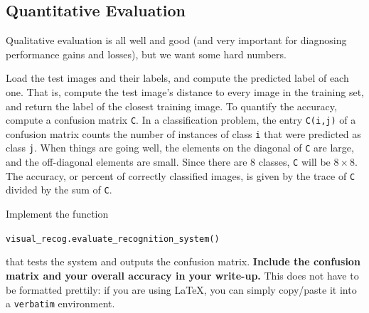 \documentclass[10pt]{article}
\makeatletter
\DeclareRobustCommand\onedot{\futurelet\@let@token\@onedot}
\def\@onedot{\ifx\@let@token.\else.\null\fi\xspace}
\def\eg{\emph{e.g}\onedot} \def\Eg{\emph{E.g}\onedot}
\makeatother
\begin{document}



\subsection{Quantitative Evaluation}

Qualitative evaluation is all well and good (and very important
for diagnosing performance gains and losses), but we want some hard numbers.

Load the test images and their labels, and compute the predicted
label of each one. That is, compute the test image's distance to every image in the training set, and return the label of the closest training image. To quantify the accuracy, compute a confusion matrix {\tt C}. In a classification problem, the entry {\tt C(i,j)} of a confusion matrix counts the number of instances of class {\tt i} that were predicted as class {\tt j}. When things are going well, the elements on the diagonal of {\tt C} are large, and the off-diagonal elements are small. Since there are 8 classes, {\tt C} will be $8 \times 8$. The accuracy, or percent of correctly classified images, is given by the trace of {\tt C} divided by the sum of {\tt C}.
 \\

\par {}
Implement the function
\begin{center}
{\tt visual\_recog.evaluate\_recognition\_system()} 
\end{center}
that tests the system and outputs the confusion matrix.
{\bf Include the confusion matrix and your overall accuracy in your write-up.} This does not have to be formatted prettily: if you are using \LaTeX, you can simply copy/paste it into a {\tt verbatim} environment. 
\end{document}
